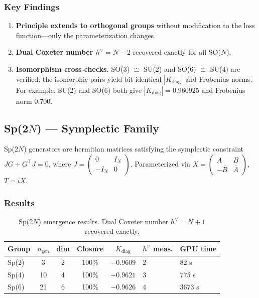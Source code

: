 \subsubsection{Key Findings}

\begin{enumerate}[label=\arabic*.]
\item \textbf{Principle extends to orthogonal groups} without modification to the loss function---only the parameterization changes.

\item \textbf{Dual Coxeter number $h^\vee = N-2$} recovered exactly for all SO($N$).

\item \textbf{Isomorphism cross-checks.} SO(3) $\cong$ SU(2) and SO(6) $\cong$ SU(4) are verified: the isomorphic pairs yield bit-identical $|K_{\mathrm{diag}}|$ and Frobenius norms. For example, SU(2) and SO(6) both give $|K_{\mathrm{diag}}| = 0.960925$ and Frobenius norm $0.700$.
\end{enumerate}

\subsection{Sp(2$N$) --- Symplectic Family}\label{sec:sp_2n}

Sp(2$N$) generators are hermitian matrices satisfying the symplectic constraint $JG + G^\top J = 0$, where $J = \begin{pmatrix} 0 & I_N \\ -I_N & 0 \end{pmatrix}$. Parameterized via $X = \begin{pmatrix} A & B \\ -\bar{B} & \bar{A} \end{pmatrix}$, $T = iX$.

\subsubsection{Results}

\begin{table}[H]
\centering
\begin{tabular}{lccccll}
\hline\hline
\textbf{Group} & \textbf{$n_{\mathrm{gen}}$} & \textbf{dim} & \textbf{Closure} & \textbf{$K_{\mathrm{diag}}$} & \textbf{$h^\vee$ meas.} & \textbf{GPU time} \\
\hline
Sp(2) & 3 & 2 & 100\% & $-0.9609$ & 2 & 82 s \\
Sp(4) & 10 & 4 & 100\% & $-0.9621$ & 3 & 775 s \\
Sp(6) & 21 & 6 & 100\% & $-0.9626$ & 4 & 3673 s \\
\hline\hline
\end{tabular}
\caption{Sp(2$N$) emergence results. Dual Coxeter number $h^\vee = N+1$ recovered exactly.}
\label{tab:sp_2n_results}
\end{table}

